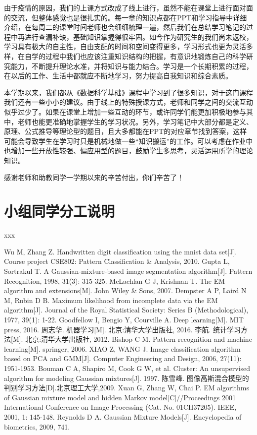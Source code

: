 \documentclass[UTF8]{ctexart}
\begin{document}
由于疫情的原因，我们的上课方式改成了线上进行，虽然不能在课堂上进行面对面的交流，但整体感觉也是很扎实的。每一章的知识点都在PPT和学习指导中详细介绍，在每周二的课堂时间老师也会细细梳理一遍，然后我们在总结学习笔记的过程中再进行查漏补缺，基础知识掌握得很牢固。如今作为研究生的我们尚未返校，学习具有极大的自主性，自由支配的时间和空间变得更多，学习形式也更为灵活多样，在自学的过程中我们也应该注重知识结构的把握，有意识地锻炼自己的科学研究能力，不断提升理论水准，并将知识与能力结合。学习是一个长期积累的过程，在以后的工作、生活中都就应不断地学习，努力提高自我知识和综合素质。

本学期以来，我们都从《数据科学基础》课程中学习到了很多知识，对于这门课程我们还有一些小小的建议。由于线上的特殊授课方式，老师和同学之间的交流互动似乎过少了。如果在课堂上增加一些互动的环节，或许同学们能更加积极地参与其中，老师也能更准确地掌握学生的学习状况。另外，学习笔记中大部分都是定义、原理、公式推导等理论型的题目，且大多都能在PPT的对应章节找到答案，这样可能会导致学生在学习时只是机械地做一些“知识搬运”的工作。可以考虑在作业中也增加一些开放性较强、偏应用型的题目，鼓励学生多思考，灵活运用所学的理论知识。

感谢老师和助教同学一学期以来的辛苦付出，你们辛苦了！
\section{小组同学分工说明}
xxx

\begin{thebibliography}{99}
	Wu M, Zhang Z. Handwritten digit classification using the mnist data set[J]. Course project CSE802: Pattern Classification \& Analysis, 2010.
	Gupta L, Sortrakul T. A Gaussian-mixture-based image segmentation algorithm[J]. Pattern Recognition, 1998, 31(3): 315-325.
	McLachlan G J, Krishnan T. The EM algorithm and extensions[M]. John Wiley \& Sons, 2007. 
	Dempster A P, Laird N M, Rubin D B. Maximum likelihood from incomplete data via the EM algorithm[J]. Journal of the Royal Statistical Society: Series B (Methodological), 1977, 39(1): 1-22. 
	Goodfellow I, Bengio Y, Courville A. Deep learning[M]. MIT press, 2016.
	周志华. 机器学习[M]. 北京:清华大学出版社, 2016.
	李航. 统计学习方法[M]. 北京:清华大学出版社, 2012.
	Bishop C M. Pattern recognition and machine learning[M]. springer, 2006.
	XIAO Z, WANG J. Image classification algorithm based on PCA and GMM[J]. Computer Engineering and Design, 2006, 27(11): 1951-1953.
	Bouman C A, Shapiro M, Cook G W, et al. Cluster: An unsupervised algorithm for modeling Gaussian mixtures[J]. 1997.
	陈雪峰. 图像高斯混合模型的判别学习方法[D].北京理工大学,2009.
	Xuan G, Zhang W, Chai P. EM algorithms of Gaussian mixture model and hidden Markov model[C]//Proceedings 2001 International Conference on Image Processing (Cat. No. 01CH37205). IEEE, 2001, 1: 145-148.
	Reynolds D A. Gaussian Mixture Models[J]. Encyclopedia of biometrics, 2009, 741.


\end{thebibliography}
\end{document}
